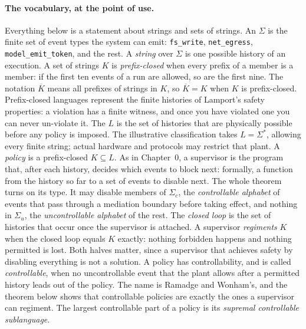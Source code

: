 \documentclass[11pt,a4paper]{article}
\theoremstyle{definition}
\theoremstyle{remark}
\begin{document}
\paragraph{The vocabulary, at the point of use.}
Everything below is a statement about strings and sets of strings. An 
$\Sigma$ is the finite set of event types the system can emit: \texttt{fs\_write},
\texttt{net\_egress}, \texttt{model\_emit\_token}, and the rest. A \emph{string} over $\Sigma$
is one possible history of an execution. A set of strings $K$ is \emph{prefix-closed} when
every prefix of a member is a member: if the first ten events of a run are allowed, so are
the first nine. The notation $\overline{K}$ means all prefixes of strings
in $K$, so $\overline{K}=K$ when $K$ is prefix-closed. Prefix-closed languages represent the finite histories of Lamport's safety properties: a violation
has a finite witness, and once you have violated one you can never un-violate it. The
 $L$ is the set of histories that are physically possible before any policy is
imposed. The illustrative classification takes $L=\Sigma^{*}$, allowing
every finite string; actual hardware and protocols may restrict that plant.
A \emph{policy} is a prefix-closed $K \subseteq L$. As in Chapter~0, a supervisor is
the program that, after each history, decides which events to block next: formally, a
function from the history so far to a set of events to disable next. The whole theorem
turns on its type. It may disable members of $\Sigma_c$, the \emph{controllable
alphabet} of events that pass through a mediation boundary before taking effect, and
nothing in $\Sigma_u$, the \emph{uncontrollable alphabet} of the rest. The
\emph{closed loop} is the set of histories that occur once the supervisor is
attached. A supervisor \emph{regiments} $K$ when the closed loop equals $K$
exactly: nothing forbidden happens and nothing permitted is lost. Both halves
matter, since a supervisor that achieves safety by disabling everything is not a
solution. A policy has controllability, and is called
\emph{controllable}, when no uncontrollable event that the plant allows after a
permitted history leads out of the policy. The name is Ramadge and Wonham's, and
the theorem below shows that controllable policies are exactly the ones a
supervisor can regiment. The largest controllable part of a policy is its
\emph{supremal controllable sublanguage}.
\end{document}
